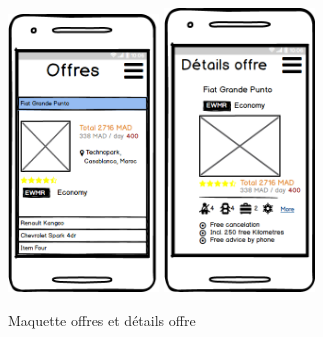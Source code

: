 \documentclass[12pt,a4paper]{report}
\begin{document}
			\begin{figure}
			\includegraphics[width=4cm]{./graphics/mk4.png}\hfill
			\includegraphics[width=4cm]{./graphics/mk5.png}
			\caption{Maquette offres et détails offre}
			\end{figure}
\end{document}
